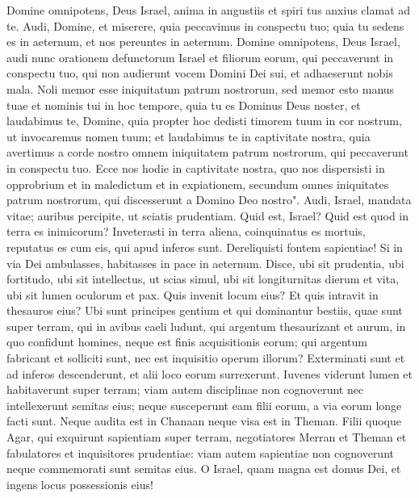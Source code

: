 \begin{biblechapter}  
\verse Domine omnipotens, Deus Israel, anima in angustiis et spiri tus anxius clamat ad te. 
\verse Audi, Domine, et miserere, quia peccavimus in conspectu tuo;  
\verse quia tu sedens es in aeternum, et nos pereuntes in aeternum. 
\verse Domine omnipotens, Deus Israel, audi nunc orationem defunctorum Israel et filiorum eorum, qui peccaverunt in conspectu tuo, qui non audierunt vocem Domini Dei sui, et adhaeserunt nobis mala. 
\verse Noli memor esse iniquitatum patrum nostrorum, sed memor esto manus tuae et nominis tui in hoc tempore, 
\verse quia tu es Dominus Deus noster, et laudabimus te, Domine, 
\verse quia propter hoc dedisti timorem tuum in cor nostrum, ut invocaremus nomen tuum; et laudabimus te in captivitate nostra, quia avertimus a corde nostro omnem iniquitatem patrum nostrorum, qui peccaverunt in conspectu tuo. 
\verse Ecce nos hodie in captivitate nostra, quo nos dispersisti in opprobrium et in maledictum et in expiationem, secundum omnes iniquitates patrum nostrorum, qui discesserunt a Domino Deo nostro". 
\verse Audi, Israel, mandata vitae; auribus percipite, ut sciatis prudentiam. 
\verse Quid est, Israel? Quid est quod in terra es inimicorum? 
\verse Inveterasti in terra aliena, coinquinatus es mortuis, reputatus es cum eis, qui apud inferos sunt. 
\verse Dereliquisti fontem sapientiae! 
\verse Si in via Dei ambulasses, habitasses in pace in aeternum. 
\verse Disce, ubi sit prudentia, ubi fortitudo, ubi sit intellectus, ut scias simul, ubi sit longiturnitas dierum et vita, ubi sit lumen oculorum et pax. 
\verse Quis invenit locum eius? Et quis intravit in thesauros eius? 
\verse Ubi sunt principes gentium et qui dominantur bestiis, quae sunt super terram, 
\verse qui in avibus caeli ludunt, 
\verse qui argentum thesaurizant et aurum, in quo confidunt homines, neque est finis acquisitionis eorum; qui argentum fabricant et solliciti sunt, nec est inquisitio operum illorum? 
\verse Exterminati sunt et ad inferos descenderunt, et alii loco eorum surrexerunt. 
\verse Iuvenes viderunt lumen et habitaverunt super terram; viam autem disciplinae non cognoverunt 
\verse nec intellexerunt semitas eius; neque susceperunt eam filii eorum, a via eorum longe facti sunt. 
\verse Neque audita est in Chanaan neque visa est in Theman. 
\verse Filii quoque Agar, qui exquirunt sapientiam super terram, negotiatores Merran et Theman et fabulatores et inquisitores prudentiae: viam autem sapientiae non cognoverunt neque commemorati sunt semitas eius. 
\verse O Israel, quam magna est domus Dei, et ingens locus possessionis eius! 

\end{biblechapter}
